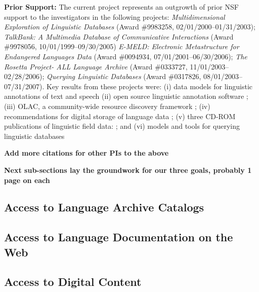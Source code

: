\documentclass[11pt]{nsf}
\def\todo#1{\textbf{\large#1}}
\begin{document}
\vspace{1in}

\textbf{Prior Support:} The current project represents an outgrowth of
prior NSF support to the investigators in the following projects:
\textit{Multidimensional Exploration of Linguistic Databases}
  (Award \#9983258, 02/01/2000--01/31/2003);
\textit{TalkBank: A Multimedia Database of Communicative Interactions}
  (Award \#9978056, 10/01/1999--09/30/2005)
\textit{E-MELD: Electronic Metastructure for Endangered Languages Data}
  (Award \#0094934, 07/01/2001--06/30/2006);
\textit{The Rosetta Project- ALL Language Archive}
  (Award \#0333727, 11/01/2003--02/28/2006);
\textit{Querying Linguistic Databases}
  (Award \#0317826, 08/01/2003--07/31/2007).
Key results from these projects were:
(i) data models for linguistic annotations of text and speech
\citep{BirdLiberman01,MaedaBird00,GraffBird00,CottonBird02,CieriBird01,ATLAS00,BirdHarrington01}
(ii) open source linguistic annotation software
\citep{Bird01acl,MaedaBird02,BirdMaeda02,MaLee02};
(iii) OLAC, a community-wide resource discovery framework
\citep{BirdSimons00,BirdSimons00survey,BirdSimons01,BirdSimons02workshop,Simons02query,SimonsBird03lht,BirdSimons03chum,Simons03display,SimonsBird03llc,BirdSimons04metadata};
(iv) recommendations for digital storage of language data
\citep{BirdSimons03language};
(v) three CD-ROM publications of linguistic field data:
\citep{BirdBell01,Bird03paradigms,Bird03ngomba};
and
(vi) models and tools for querying linguistic databases
\citep{BirdBuneman01,BirdBunemanTan00,LaiBird04,Bird05planx,Bird06icde}

\todo{Add more citations for other PIs to the above}

\todo{Next sub-sections lay the groundwork for our three goals,
  probably 1 page on each}

\subsection{Access to Language Archive Catalogs}

\vspace{1in}

\subsection{Access to Language Documentation on the Web}

\vspace{1in}

\subsection{Access to Digital Content}
\end{document}

